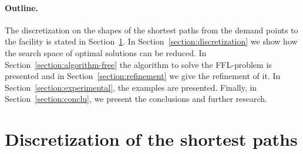 \documentclass[11pt,a4paper,oneside,onecolumn]{article}
\begin{document}
\paragraph{Outline.}
The discretization on the shapes of the shortest paths from the
demand points to the facility is stated in Section~\ref{section:preliminaries}.
In Section~\ref{section:discretization} we show how the search
space of optimal solutions can be reduced.
In Section~\ref{section:algorithm-free} the algorithm to solve 
the FFL-problem is presented and in Section~\ref{section:refinement} we give the
refinement of it. In Section~\ref{section:experimental}, the examples are presented.
Finally, in Section~\ref{section:conclu}, we present the conclusions
and further research.


\section{Discretization of the shortest paths}
\label{section:preliminaries}
\end{document}
